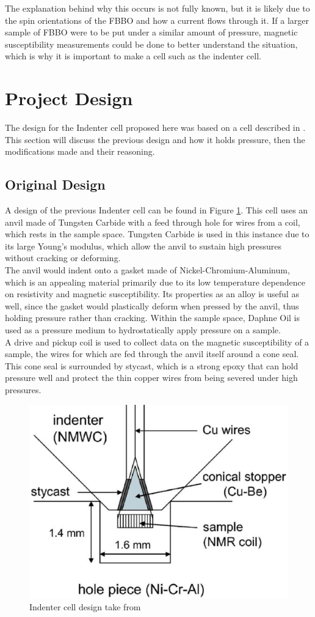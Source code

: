 \documentclass[11pt,onecolumn]{article}
\begin{document}
The explanation behind why this occurs is not fully known, but it is likely due to the spin orientations of the FBBO and how a current flows through it. If a larger sample of FBBO were to be put under a similar amount of pressure, magnetic susceptibility measurements could be done to better understand the situation, which is why it is important to make a cell such as the indenter cell.

\section{Project Design}

The design for the Indenter cell proposed here was based on a cell described in \cite{IndenterCell}. This section will discuss the previous design and how it holds pressure, then the modifications made and their reasoning.

\subsection{Original Design}

A design of the previous Indenter cell can be found in Figure \ref{fig:4}. This cell uses an anvil made of Tungsten Carbide with a feed through hole for wires from a coil, which rests in the sample space. Tungsten Carbide is used in this instance due to its large Young's modulus, which allow the anvil to sustain high pressures without cracking or deforming.\\

The anvil would indent onto a gasket made of Nickel-Chromium-Aluminum, which is an appealing material primarily due to its low temperature dependence on resistivity and magnetic susceptibility.\cite{expmethods} Its properties as an alloy is useful as well, since the gasket would plastically deform when pressed by the anvil, thus holding pressure rather than cracking. Within the sample space, Daphne Oil is used as a pressure medium to hydrostatically apply pressure on a sample.\\

A drive and pickup coil is used to collect data on the magnetic susceptibility of a sample, the wires for which are fed through the anvil itself around a cone seal. This cone seal is surrounded by stycast, which is a strong epoxy that can hold pressure well and protect the thin copper wires from being severed under high pressures.

\begin{figure}[ht]
	\centering
	\includegraphics[width=.5\columnwidth]{figures/old_cell.png}
	\caption{Indenter cell design take from \cite{IndenterCell}}
	\label{fig:4}
\end{figure}
\end{document}

